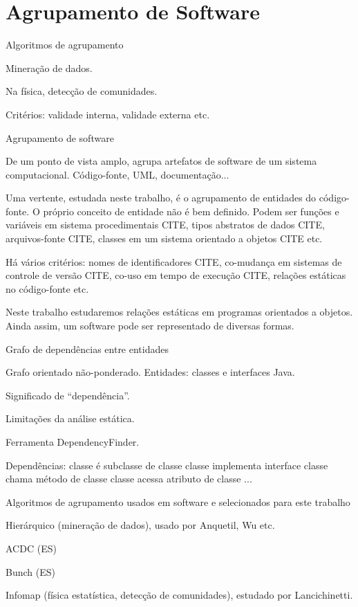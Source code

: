 % 

\chapter{Agrupamento de Software}

\begin{section}{Algoritmos de agrupamento}

Mineração de dados.

Na física, detecção de comunidades.

Critérios: validade interna, validade externa etc.

\end{section}
\begin{section}{Agrupamento de software}

De um ponto de vista amplo, agrupa artefatos de software de um sistema computacional. Código-fonte, UML, documentação...

Uma vertente, estudada neste trabalho, é o agrupamento de entidades do código-fonte. O próprio conceito de entidade não é bem definido. Podem ser funções e variáveis em sistema procedimentais CITE, tipos abstratos de dados CITE, arquivos-fonte CITE, classes em um sistema orientado a objetos CITE etc.

Há vários critérios: nomes de identificadores CITE, co-mudança em sistemas de controle de versão CITE, co-uso em tempo de execução CITE, relações estáticas no código-fonte etc.

Neste trabalho estudaremos relações estáticas em programas orientados a objetos. Ainda assim, um software pode ser representado de diversas formas.

\end{section}
\begin{section}{Grafo de dependências entre entidades}

Grafo orientado não-ponderado.
Entidades: classes e interfaces Java.

Significado de ``dependência''.

Limitações da análise estática.

Ferramenta DependencyFinder.

Dependências:
  classe é subclasse de classe
  classe implementa interface
  classe chama método de classe
  classe acessa atributo de classe
  ...

\end{section}
\begin{section}{Algoritmos de agrupamento usados em software e selecionados para este trabalho}

Hierárquico (mineração de dados), usado por Anquetil, Wu etc.

ACDC (ES)

Bunch (ES)

Infomap (física estatística, detecção de comunidades), estudado por Lancichinetti.

\end{section}


